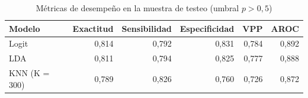 \begin{table}[H]
\caption{Métricas de desempeño en la muestra de testeo (umbral $p>0,5$)}
\label{tab:metricas_testeo}
\centering
\footnotesize
\begin{tabular}{lrrrrr}
\toprule
Modelo & Exactitud & Sensibilidad & Especificidad & VPP & AROC \\
\midrule
Logit & 0,814 & 0,792 & 0,831 & 0,784 & 0,892 \\
LDA & 0,811 & 0,794 & 0,825 & 0,777 & 0,888 \\
KNN (K = 300) & 0,789 & 0,826 & 0,760 & 0,726 & 0,872 \\
\bottomrule
\end{tabular}
\end{table}
